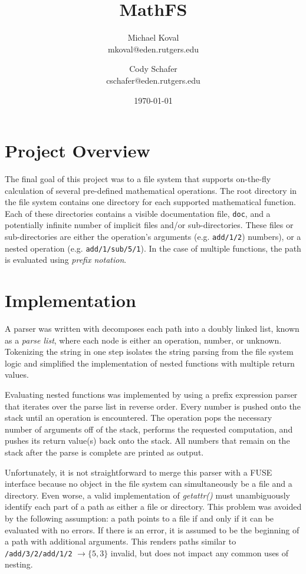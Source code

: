 \documentclass[10pt]{article}
\title{MathFS}
\author{
	Michael Koval \\
	mkoval@eden.rutgers.edu
	\and
	Cody Schafer \\
	cschafer@eden.rutgers.edu
}
\date{\today}
\begin{document}
\maketitle

\section{Project Overview}
The final goal of this project was to a file system that supports
on-the-fly calculation of several pre-defined mathematical operations. The
root directory in the file system contains one directory for each
supported mathematical function. Each of these directories contains a
visible documentation file, \texttt{doc}, and a potentially infinite
number of implicit files and/or sub-directories. These files or
sub-directories are either the operation's arguments (e.g.
\texttt{add/1/2}) numbers), or a nested operation (e.g.
\texttt{add/1/sub/5/1}). In the case of multiple functions, the path is
evaluated using \textit{prefix notation}.

\section{Implementation}
A parser was written with decomposes each path into a doubly linked
list, known as a \textit{parse list}, where each node is either an
operation, number, or unknown. Tokenizing the string in one step isolates
the string parsing from the file system logic and simplified the
implementation of nested functions with multiple return values.

Evaluating nested functions was implemented by using a prefix expression
parser that iterates over the parse list in reverse order. Every number is
pushed onto the stack until an operation is encountered. The operation
pops the necessary number of arguments off of the stack, performs the
requested computation, and pushes its return value(s) back onto the stack.
All numbers that remain on the stack after the parse is complete are
printed as output.

Unfortunately, it is not straightforward to merge this parser with a FUSE
interface because no object in the file system can simultaneously be a file
and a directory. Even worse, a valid implementation of \textit{getattr()}
must unambiguously identify each part of a path as either a file or
directory. This problem was avoided by the following assumption: a path
points to a file if and only if it can be evaluated with no errors. If
there is an error, it is assumed to be the beginning of a path with
additional arguments. This renders paths similar to
\texttt{/add/3/2/add/1/2} $\rightarrow \{5, 3\}$ invalid, but does not
impact any common uses of nesting.
\end{document}
